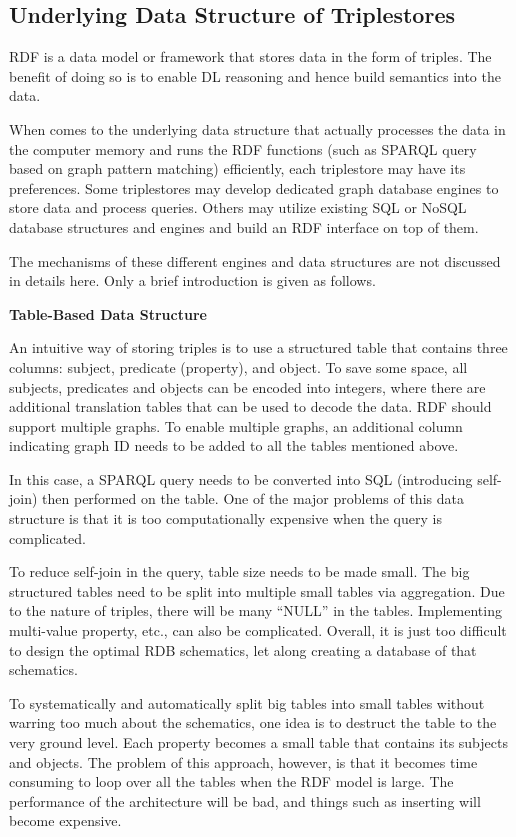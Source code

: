 \subsection{Underlying Data Structure of Triplestores}

RDF is a data model or framework that stores data in the form of triples. The benefit of doing so is to enable DL reasoning and hence build semantics into the data. 

When comes to the underlying data structure that actually processes the data in the computer memory and runs the RDF functions (such as SPARQL query based on graph pattern matching) efficiently, each triplestore may have its preferences. Some triplestores may develop dedicated graph database engines to store data and process queries. Others may utilize existing SQL or NoSQL database structures and engines and build an RDF interface on top of them.

The mechanisms of these different engines and data structures are not discussed in details here. Only a brief introduction is given as follows.

\vspace{0.1in}
\noindent \textbf{Table-Based Data Structure}
\vspace{0.1in}

An intuitive way of storing triples is to use a structured table that contains three columns: subject, predicate (property), and object. To save some space, all subjects, predicates and objects can be encoded into integers, where there are additional translation tables that can be used to decode the data. RDF should support multiple graphs. To enable multiple graphs, an additional column indicating graph ID needs to be added to all the tables mentioned above.

In this case, a SPARQL query needs to be converted into SQL (introducing self-join) then performed on the table. One of the major problems of this data structure is that it is too computationally expensive when the query is complicated.

To reduce self-join in the query, table size needs to be made small. The big structured tables need to be split into multiple small tables via aggregation. Due to the nature of triples, there will be many ``NULL'' in the tables. Implementing multi-value property, etc., can also be complicated. Overall, it is just too difficult to design the optimal RDB schematics, let along creating a database of that schematics.

To systematically and automatically split big tables into small tables without warring too much about the schematics, one idea is to destruct the table to the very ground level. Each property becomes a small table that contains its subjects and objects. The problem of this approach, however, is that it becomes time consuming to loop over all the tables when the RDF model is large. The performance of the architecture will be bad, and things such as inserting will become expensive.

